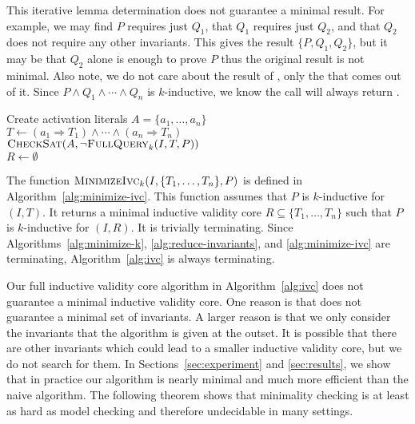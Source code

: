 This iterative lemma determination does not guarantee a minimal
result. For example, we may find $P$ requires just $Q_1$, that $Q_1$
requires just $Q_2$, and that $Q_2$ does not require any other
invariants. This gives the result $\{P, Q_1, Q_2\}$, but it may be
that $Q_2$ alone is enough to prove $P$ thus the original result is
not minimal. Also note, we do not care about the result of \checksat,
only the \unsatcore that comes out of it. Since $P \land Q_1 \land
\cdots \land Q_n$ is $k$-inductive, we know the \checksat call will
always return \unsat.

\begin{algorithm}[t]
  Create activation literals $A = \{a_1, \ldots, a_n\}$ \\
  $T \leftarrow (a_1 \Rightarrow T_1) \land \cdots \land (a_n \Rightarrow T_n)$ \\
  $\textsc{CheckSat}(A, \neg\textsc{FullQuery}_k(I, T, P))$ \\
  $R \leftarrow \emptyset$ \\
\caption{$\minivc_k(I, \{T_1, \ldots, T_n\}, P)$}
\label{alg:minimize-ivc}
\end{algorithm}

The function $\minivc_k(I, \{T_1, \ldots, T_n\}, P)$ is defined in
Algorithm~\ref{alg:minimize-ivc}. This function assumes that $P$ is
$k$-inductive for $(I, T)$. It returns a minimal inductive validity
core $R \subseteq \{T_1, \ldots, T_n\}$ such that $P$ is $k$-inductive
for $(I, R)$. It is trivially terminating. Since
Algorithms~\ref{alg:minimize-k}, \ref{alg:reduce-invariants}, and
\ref{alg:minimize-ivc} are terminating, Algorithm~\ref{alg:ivc} is
always terminating.

Our full inductive validity core algorithm in Algorithm~\ref{alg:ivc}
does not guarantee a minimal inductive validity core. One reason is
that \reduceinv does not guarantee a minimal set of invariants. A
larger reason is that we only consider the invariants that the
algorithm is given at the outset. It is possible that there are other
invariants which could lead to a smaller inductive validity core, but
we do not search for them. In Sections~\ref{sec:experiment} and
\ref{sec:results}, we show that in practice our algorithm is nearly
minimal and much more efficient than the naive algorithm. The
following theorem shows that minimality checking is at least as hard
as model checking and therefore undecidable in many settings.

